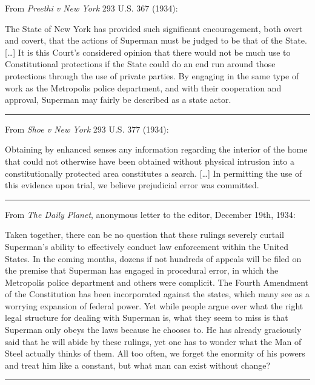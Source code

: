 \documentclass[ebook,12pt]{memoir}
\begin{document}
From \emph{Preethi v New York} 293 U.S. 367 (1934):

The State of New York has provided such significant encouragement, both
overt and covert, that the actions of Superman must be judged to be that
of the State. {[}\ldots{]} It is this Court's considered opinion that
there would not be much use to Constitutional protections if the State
could do an end run around those protections through the use of private
parties. By engaging in the same type of work as the Metropolis police
department, and with their cooperation and approval, Superman may fairly
be described as a state actor.

\begin{center}\rule{0.5\linewidth}{0.5pt}\end{center}

From \emph{Shoe v New York} 293 U.S. 377 (1934):

Obtaining by enhanced senses any information regarding the interior of
the home that could not otherwise have been obtained without physical
intrusion into a constitutionally protected area constitutes a search.
{[}\ldots{]} In permitting the use of this evidence upon trial, we
believe prejudicial error was committed.

\begin{center}\rule{0.5\linewidth}{0.5pt}\end{center}

From \emph{The Daily Planet}, anonymous letter to the editor, December
19th, 1934:

Taken together, there can be no question that these rulings severely
curtail Superman's ability to effectively conduct law enforcement within
the United States. In the coming months, dozens if not hundreds of
appeals will be filed on the premise that Superman has engaged in
procedural error, in which the Metropolis police department and others
were complicit. The Fourth Amendment of the Constitution has been
incorporated against the states, which many see as a worrying expansion
of federal power. Yet while people argue over what the right legal
structure for dealing with Superman is, what they seem to miss is that
Superman only obeys the laws because he chooses to. He has already
graciously said that he will abide by these rulings, yet one has to
wonder what the Man of Steel actually thinks of them. All too often, we
forget the enormity of his powers and treat him like a constant, but
what man can exist without change?

\begin{center}\rule{0.5\linewidth}{0.5pt}\end{center}
\end{document}
